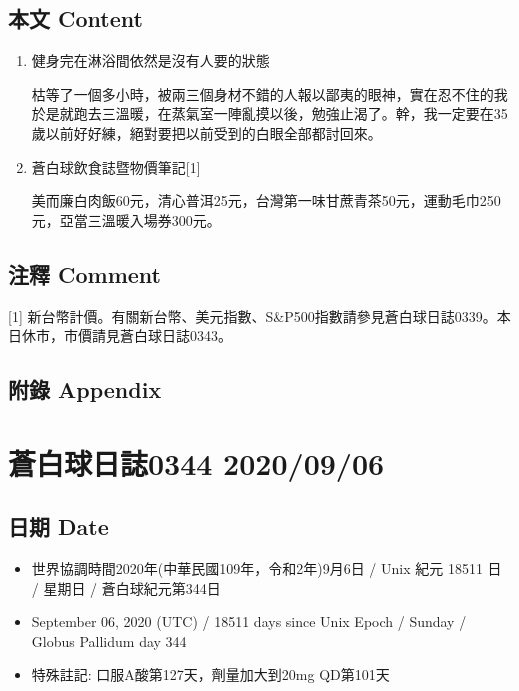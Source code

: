 \documentclass[
]{article}
\providecommand{\tightlist}{%
  \setlength{\itemsep}{0pt}\setlength{\parskip}{0pt}}
\begin{document}
\hypertarget{ux672cux6587-content-4}{%
\subsection{本文 Content}\label{ux672cux6587-content-4}}

\begin{enumerate}
\def\labelenumi{\arabic{enumi}.}
\item
  健身完在淋浴間依然是沒有人要的狀態

  枯等了一個多小時，被兩三個身材不錯的人報以鄙夷的眼神，實在忍不住的我於是就跑去三溫暖，在蒸氣室一陣亂摸以後，勉強止渴了。幹，我一定要在35歲以前好好練，絕對要把以前受到的白眼全部都討回來。
\item
  蒼白球飲食誌暨物價筆記{[}1{]}

  美而廉白肉飯60元，清心普洱25元，台灣第一味甘蔗青茶50元，運動毛巾250元，亞當三溫暖入場券300元。
\end{enumerate}

\hypertarget{ux6ce8ux91cb-comment-4}{%
\subsection{注釋 Comment}\label{ux6ce8ux91cb-comment-4}}

{[}1{]}
新台幣計價。有關新台幣、美元指數、S\&P500指數請參見蒼白球日誌0339。本日休市，市價請見蒼白球日誌0343。

\hypertarget{ux9644ux9304-appendix-4}{%
\subsection{附錄 Appendix}\label{ux9644ux9304-appendix-4}}

\hypertarget{ux84bcux767dux7403ux65e5ux8a8c0344-20200906}{%
\section{蒼白球日誌0344
2020/09/06}\label{ux84bcux767dux7403ux65e5ux8a8c0344-20200906}}

\hypertarget{ux65e5ux671f-date-5}{%
\subsection{日期 Date}\label{ux65e5ux671f-date-5}}

\begin{itemize}
\tightlist
\item
  世界協調時間2020年(中華民國109年，令和2年)9月6日 / Unix 紀元 18511 日
  / 星期日 / 蒼白球紀元第344日
\item
  September 06, 2020 (UTC) / 18511 days since Unix Epoch / Sunday /
  Globus Pallidum day 344
\item
  特殊註記: 口服A酸第127天，劑量加大到20mg QD第101天
\end{itemize}
\end{document}
